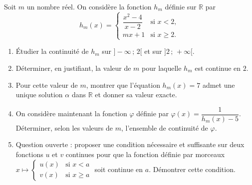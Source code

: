 \documentclass[11pt]{article}
\begin{document}
\begin{exercice}
Soit $m$ un nombre réel. On considère la fonction $h_m$ définie sur $\mathbb{R}$ par
\[ h_m(x)=\begin{cases} \dfrac{x^2-4}{x-2} & \text{si } x<2,\\[4pt] mx+1 & \text{si } x\geq 2. \end{cases} \]
\begin{enumerate}
\item Étudier la continuité de $h_m$ sur $]-\infty\,;\,2[$ et sur $]2\,;\,+\infty[$.
\item Déterminer, en justifiant, la valeur de $m$ pour laquelle $h_m$ est continue en $2$.
\item Pour cette valeur de $m$, montrer que l'équation $h_m(x)=7$ admet une unique solution $\alpha$ dans $\mathbb{R}$ et donner sa valeur exacte.
\item On considère maintenant la fonction $\varphi$ définie par $\varphi(x)=\dfrac{1}{h_m(x)-5}$. Déterminer, selon les valeurs de $m$, l'ensemble de continuité de $\varphi$.
\item Question ouverte : proposer une condition nécessaire et suffisante sur deux fonctions $u$ et $v$ continues pour que la fonction définie par morceaux $x\mapsto\begin{cases}u(x)&\text{si }x<a\\ v(x)&\text{si }x\geq a\end{cases}$ soit continue en $a$. Démontrer cette condition.
\end{enumerate}
\end{exercice}
\end{document}
